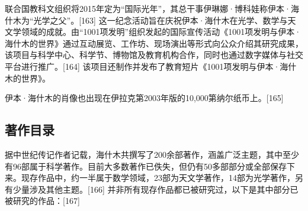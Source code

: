 联合国教科文组织将2015年定为“国际光年”，其总干事伊琳娜·博科娃称伊本·海什木为“光学之父”。[163] 这一纪念活动旨在庆祝伊本·海什木在光学、数学与天文学领域的成就。由“1001项发明”组织发起的国际宣传活动《1001项发明与伊本·海什木的世界》通过互动展览、工作坊、现场演出等形式向公众介绍其研究成果，该项目与科学中心、科学节、博物馆及教育机构合作，同时也通过数字媒体与社交平台进行推广。[164] 该项目还制作并发布了教育短片《1001项发明与伊本·海什木的世界》。

伊本·海什木的肖像也出现在伊拉克第2003年版的10,000第纳尔纸币上。[165]
\subsection{著作目录}
据中世纪传记作者记载，海什木共撰写了200余部著作，涵盖广泛主题，其中至少有96部属于科学著作。目前大多数著作已佚失，但仍有50多部部分或全部保存下来。现存作品中，约一半属于数学领域，23部为天文学著作，14部为光学著作，另有少量涉及其他主题。[166] 并非所有现存作品都已被研究过，以下是其中部分已被研究的作品：[167]

